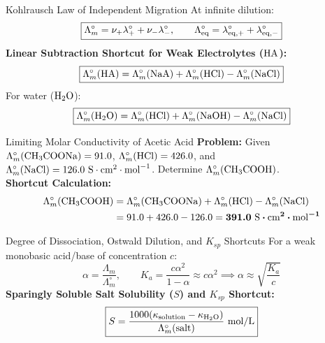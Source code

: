 \documentclass[11pt,a4paper]{report}
\newcommand{\ans}[1]{\ifmmode\bm{#1}\else\textbf{#1}\fi}
\begin{document}
\begin{shortcutbox}{Kohlrausch Law of Independent Migration}
At infinite dilution:
\begin{equation}
\boxed{
\Lambda_m^\circ = \nu_+ \lambda_+^\circ + \nu_- \lambda_-^\circ, \qquad \Lambda_{\rm eq}^\circ = \lambda_{\rm eq,+}^\circ + \lambda_{\rm eq,-}^\circ
}
\end{equation}
\textbf{Linear Subtraction Shortcut for Weak Electrolytes ($\ce{HA}$):}
\begin{equation}
\boxed{
\Lambda_m^\circ(\ce{HA}) = \Lambda_m^\circ(\ce{NaA}) + \Lambda_m^\circ(\ce{HCl}) - \Lambda_m^\circ(\ce{NaCl})
}
\end{equation}
For water ($\ce{H2O}$):
\begin{equation}
\boxed{
\Lambda_m^\circ(\ce{H2O}) = \Lambda_m^\circ(\ce{HCl}) + \Lambda_m^\circ(\ce{NaOH}) - \Lambda_m^\circ(\ce{NaCl})
}
\end{equation}
\end{shortcutbox}

\begin{microbox}{Limiting Molar Conductivity of Acetic Acid}
\textbf{Problem:} Given $\Lambda_m^\circ(\ce{CH3COONa}) = 91.0$, $\Lambda_m^\circ(\ce{HCl}) = 426.0$, and $\Lambda_m^\circ(\ce{NaCl}) = 126.0\text{ S}\cdot\text{cm}^2\cdot\text{mol}^{-1}$. Determine $\Lambda_m^\circ(\ce{CH3COOH})$.\\
\textbf{Shortcut Calculation:}
\begin{align*}
\Lambda_m^\circ(\ce{CH3COOH}) &= \Lambda_m^\circ(\ce{CH3COONa}) + \Lambda_m^\circ(\ce{HCl}) - \Lambda_m^\circ(\ce{NaCl}) \\
&= 91.0 + 426.0 - 126.0 = \ans{391.0\text{ S}\cdot\text{cm}^2\cdot\text{mol}^{-1}}
\end{align*}
\end{microbox}

\begin{shortcutbox}{Degree of Dissociation, Ostwald Dilution, and $K_{sp}$ Shortcuts}
For a weak monobasic acid/base of concentration $c$:
\begin{equation}
\boxed{
\alpha = \frac{\Lambda_m}{\Lambda_m^\circ}, \qquad K_a = \frac{c \alpha^2}{1 - \alpha} \approx c \alpha^2 \implies \alpha \approx \sqrt{\frac{K_a}{c}}
}
\end{equation}
\textbf{Sparingly Soluble Salt Solubility ($S$) and $K_{sp}$ Shortcut:}
\begin{equation}
\boxed{
S = \frac{1000 (\kappa_{\rm solution} - \kappa_{\ce{H2O}})}{\Lambda_m^\circ(\text{salt})}\text{ mol/L}
}
\end{equation}
\end{shortcutbox}
\end{document}
